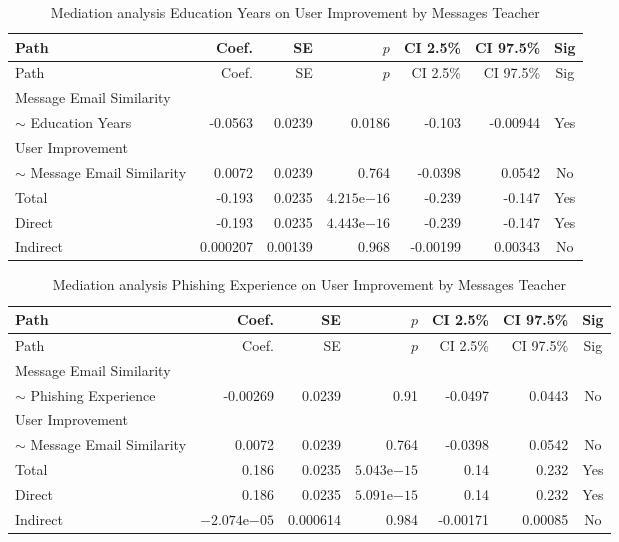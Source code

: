 \begin{longtable}{lrrrrrc}
            \caption{Mediation analysis Education Years on User Improvement by  Messages Teacher}\label{tab:mediation Education Years on User Improvement by  Messages Teacher}\\
            \toprule
            Path & Coef. & SE & $p$ & CI 2.5\% & CI 97.5\% & Sig \\
            \midrule
            \endfirsthead
            \toprule
            Path & Coef. & SE & $p$ & CI 2.5\% & CI 97.5\% & Sig \\
            \midrule
            \endhead
            \bottomrule
            \endfoot
            Message Email Similarity\\ $\sim$ Education Years & -0.0563 & 0.0239 & 0.0186 & -0.103 & -0.00944 & Yes \\
User Improvement\\ $\sim$ Message Email Similarity & 0.0072 & 0.0239 & 0.764 & -0.0398 & 0.0542 & No \\
Total & -0.193 & 0.0235 & $4.215\mathrm{e}{-16}$ & -0.239 & -0.147 & Yes \\
Direct & -0.193 & 0.0235 & $4.443\mathrm{e}{-16}$ & -0.239 & -0.147 & Yes \\
Indirect & 0.000207 & 0.00139 & 0.968 & -0.00199 & 0.00343 & No \\
\end{longtable}

\begin{longtable}{lrrrrrc}
            \caption{Mediation analysis Phishing Experience on User Improvement by  Messages Teacher}\label{tab:mediation Phishing Experience on User Improvement by  Messages Teacher}\\
            \toprule
            Path & Coef. & SE & $p$ & CI 2.5\% & CI 97.5\% & Sig \\
            \midrule
            \endfirsthead
            \toprule
            Path & Coef. & SE & $p$ & CI 2.5\% & CI 97.5\% & Sig \\
            \midrule
            \endhead
            \bottomrule
            \endfoot
            Message Email Similarity\\ $\sim$ Phishing Experience & -0.00269 & 0.0239 & 0.91 & -0.0497 & 0.0443 & No \\
User Improvement\\ $\sim$ Message Email Similarity & 0.0072 & 0.0239 & 0.764 & -0.0398 & 0.0542 & No \\
Total & 0.186 & 0.0235 & $5.043\mathrm{e}{-15}$ & 0.14 & 0.232 & Yes \\
Direct & 0.186 & 0.0235 & $5.091\mathrm{e}{-15}$ & 0.14 & 0.232 & Yes \\
Indirect & $-2.074\mathrm{e}{-05}$ & 0.000614 & 0.984 & -0.00171 & 0.00085 & No \\
\end{longtable}

